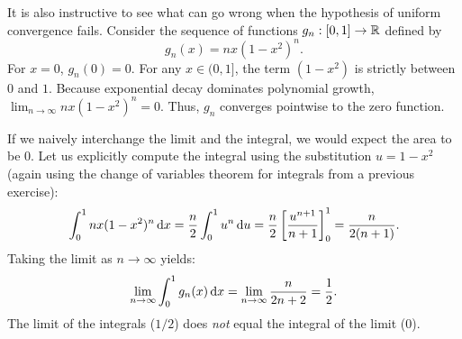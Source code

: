 \documentclass[../analysis1.tex]{subfiles}
\begin{document}
\begin{example}
    It is also instructive to see what can go wrong when the hypothesis of uniform convergence fails. Consider the sequence of functions $g_n:[0,1]\to\mathbb{R}$ defined by
    \[
        g_n(x) = n x (1-x^2)^n.
    \]
    For $x=0$, $g_n(0) = 0$. For any $x \in (0,1]$, the term $(1-x^2)$ is strictly between $0$ and $1$. Because exponential decay dominates polynomial growth, $\lim_{n \to \infty} n x (1-x^2)^n = 0$. Thus, $g_n$ converges pointwise to the zero function.
    \begin{center}
    \end{center}
    
    If we naively interchange the limit and the integral, we would expect the area to be $0$. Let us explicitly compute the integral using the substitution $u = 1-x^2$ (again using the change of variables theorem for integrals from a previous exercise):
    \[
        \int_0^1 n x (1-x^2)^n \d{x} = \frac{n}{2} \int_0^1 u^n \d{u} = \frac{n}{2} \left[ \frac{u^{n+1}}{n+1} \right]_0^1 = \frac{n}{2(n+1)}.
    \]
    Taking the limit as $n \to \infty$ yields:
    \[
        \lim_{n \to \infty} \int_0^1 g_n(x) \d{x} = \lim_{n \to \infty} \frac{n}{2n+2} = \frac{1}{2}.
    \]
    The limit of the integrals ($1/2$) does \textit{not} equal the integral of the limit ($0$). 
    

\end{example}
\end{document}
